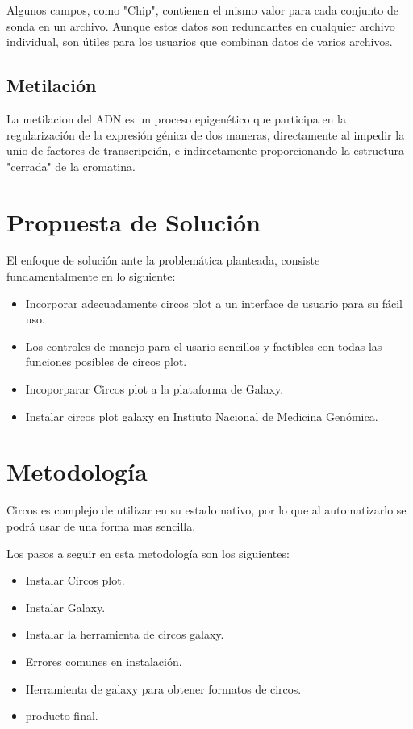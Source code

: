 \documentclass[12pt,letterpaper]{article}
\begin{document}
Algunos campos, como "Chip", contienen el mismo valor para cada conjunto de sonda en un archivo. Aunque estos datos son redundantes en cualquier archivo individual, son útiles para los usuarios que combinan datos de varios archivos.

\subsection{Metilación} 
La metilacion del ADN es un proceso epigenético que participa en la regularización de la expresión génica de dos maneras, directamente al impedir la unio de factores de transcripción, e indirectamente proporcionando la estructura "cerrada" de la cromatina.   
\section{Propuesta de Solución}
El enfoque de solución ante la problemática planteada, consiste fundamentalmente en lo siguiente:
\begin{itemize}
\item Incorporar adecuadamente circos plot a un interface de usuario para su fácil uso.
\item Los controles de manejo para el usario sencillos y factibles con todas  las funciones posibles de circos plot.
\item Incoporparar Circos plot a la plataforma de Galaxy.
\item Instalar circos plot galaxy en Instiuto Nacional de Medicina Genómica.
\end{itemize}
\section{Metodología}
Circos es complejo de utilizar en su estado nativo, por lo que al automatizarlo se podrá usar de una forma mas sencilla.

Los pasos a seguir en esta metodología son los siguientes:

\begin{itemize}

\item Instalar Circos plot.
\item Instalar Galaxy.
\item Instalar la herramienta de circos galaxy. 
\item Errores comunes en instalación.
\item Herramienta de galaxy para obtener formatos de circos.
\item producto final.
\end{itemize}
\end{document}
